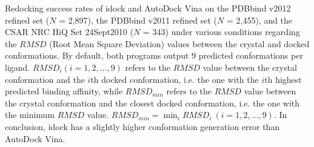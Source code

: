\documentclass[10pt]{article}
\begin{document}
\begin{table}[!ht]
\begin{flushleft}\label{SuccessRate} Redocking success rates of idock and AutoDock Vina on the PDBbind v2012 refined set ($N$ = 2,897), the PDBbind v2011 refined set ($N$ = 2,455), and the CSAR NRC HiQ Set 24Sept2010 ($N$ = 343) under various conditions regarding the $RMSD$ (Root Mean Square Deviation) values between the crystal and docked conformations. By default, both programs output 9 predicted conformations per ligand. $RMSD_i (i = 1,2,...,9)$ refers to the $RMSD$ value between the crystal conformation and the $i$th docked conformation, i.e. the one with the $i$th highest predicted binding affinity, while $RMSD_{min}$ refers to the $RMSD$ value between the crystal conformation and the closest docked conformation, i.e. the one with the minimum $RMSD$ value. $RMSD_{min} = \displaystyle\min_{i}RMSD_i\ (i = 1,2,...,9)$. In conclusion, idock has a slightly higher conformation generation error than AutoDock Vina.
\end{flushleft}
\end{table}
\end{document}
